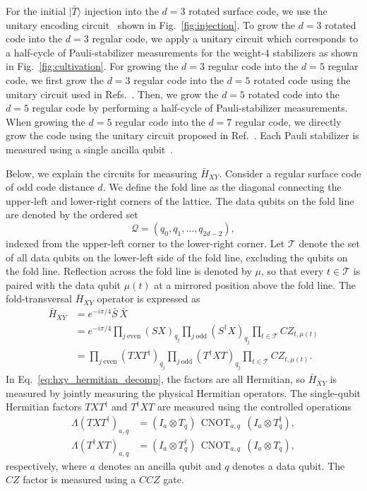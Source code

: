 \documentclass[
 reprint,
 amsmath,amssymb,
 pra,superscriptaddress, nofootinbib
]{revtex4-2}
\theoremstyle{definition}
\theoremstyle{plain}
\newcommand{\CNOT}{\operatorname{CNOT}}
\begin{document}
For the initial $|\bar{T}\rangle$ injection into the $d=3$ rotated surface code, we use the unitary encoding circuit~\cite{tsai2025unitaryencodersurfacecodes} shown in Fig.~\ref{fig:injection}.
To grow the $d=3$ rotated code into the $d=3$ regular code, we apply a unitary circuit which corresponds to a half-cycle of Pauli-stabilizer measurements for the weight-$4$ stabilizers as shown in Fig.~\ref{fig:cultivation}. 
For growing the $d=3$ regular code into the $d=5$ regular code, we first grow the $d=3$ regular code into the $d=5$ rotated code using the unitary circuit used in Refs.~\cite{gpvl-lg4c,tsai2025unitaryencodersurfacecodes}. Then, we grow the $d=5$ rotated code into the $d=5$ regular code by performing a half-cycle of Pauli-stabilizer measurements. 
When growing the $d=5$ regular code into the $d=7$ regular code, we directly grow the code using the unitary circuit proposed in Ref.~\cite{Higgott2021optimallocalunitary}.
Each Pauli stabilizer is measured using a single ancilla qubit~\cite{PhysRevResearch.7.033074}.

Below, we explain the circuits for measuring $\bar{H}_{XY}$.
Consider a regular surface code of odd code distance $d$. We define the fold line as the diagonal connecting the upper-left and lower-right corners of the lattice. The data qubits on the fold line are denoted by the ordered set
\begin{equation}
    \mathcal{Q}=(q_0,q_1,\ldots,q_{2d-2}),
\end{equation}
indexed from the upper-left corner to the lower-right corner. Let $\mathcal{T}$ denote the set of all data qubits on the lower-left side of the fold line, excluding the qubits on the fold line. Reflection across the fold line is denoted by $\mu$, so that every $t\in\mathcal{T}$ is paired with the data qubit $\mu(t)$ at a mirrored position above the fold line.
The fold-transversal $\bar{H}_{XY}$ operator is expressed as
\begin{align}
    \bar{H}_{XY}
    &=e^{-i\pi/4}\bar{S}\,\bar{X}
    \nonumber\\
    &=e^{-i\pi/4}
    \prod_{j\ \mathrm{even}}(SX)_{q_j}
    \prod_{j\ \mathrm{odd}}(S^{\dagger}X)_{q_j}
    \prod_{t \in\mathcal{T}}CZ_{t,\mu(t)}
    \nonumber\\
    &=\prod_{j\ \mathrm{even}}(TXT^\dagger)_{q_j}
    \prod_{j\ \mathrm{odd}}(T^{\dagger}XT)_{q_j}
    \prod_{t \in\mathcal{T}}CZ_{t,\mu(t)}.
    \label{eq:hxy_hermitian_decomp}
\end{align}
In Eq.~\eqref{eq:hxy_hermitian_decomp}, the factors are all Hermitian, so $\bar{H}_{XY}$ is measured by jointly measuring the physical Hermitian operators. The single-qubit Hermitian factors $TXT^\dagger$ and $T^\dagger XT$ are measured using the controlled operations
\begin{align}
    \Lambda(TXT^\dagger)_{a,q}
    &=(I_a\otimes T_q)\,
      \CNOT_{a,q}\,
      (I_a\otimes T_q^{\dagger}),
    \\
    \Lambda(T^\dagger XT)_{a,q}
    &=(I_a\otimes T_q^{\dagger})\,
      \CNOT_{a,q}\,
      (I_a\otimes T_q),
\end{align}
respectively, where $a$ denotes an ancilla qubit and $q$ denotes a data qubit.
The $CZ$ factor is measured using a $CCZ$ gate. 
\end{document}
